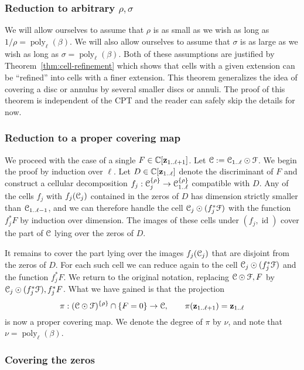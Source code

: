 \documentclass[reqno]{amsart}
\renewcommand\~[1]{\widetilde{#1}}
\def\poly{\operatorname{poly}} \def\J{\operatorname{J}}
\def\cF{{\mathcal F}} \def\cL{{\mathcal L}} \def\cR{{\mathcal R}}
\def\id{\operatorname{id}}
\def\vz{{\mathbf z}}
\def\he#1{{\{#1\}}}
\def\hrho{{\he\rho}}
\begin{document}
\subsubsection{Reduction to arbitrary $\rho,\sigma$}

We will allow ourselves to assume that $\rho$ is as small as we wish
as long as $1/\rho=\poly_\ell(\beta)$. We will also allow ourselves to
assume that $\sigma$ is as large as we wish as long as
$\sigma=\poly_\ell(\beta)$. Both of these assumptions are justified by
Theorem~\ref{thm:cell-refinement} which shows that cells with a given
extension can be ``refined'' into cells with a finer extension. This
theorem generalizes the idea of covering a disc or annulus by several
smaller discs or annuli. The proof of this theorem is independent of
the CPT and the reader can safely skip the details for now.


\subsubsection{Reduction to a proper covering map}
We proceed with the case of a single $F\in\C[\vz_{1..\ell+1}]$. Let
$\cC:=\cC_{1..\ell}\odot\cF$. We begin the proof by induction over
$\ell$. Let $D\in\C[\vz_{1..\ell}]$ denote the discriminant of $F$ and
construct a cellular decomposition
$f_j:\cC_j^\hrho\to\cC_{1..\ell}^\hrho$ compatible with $D$. Any of the cells $f_j$ with
$f_j({\mathcal C}_j)$ contained in the zeros of $D$ has dimension strictly
smaller than ${\mathcal C}_{1..\ell-1}$, and we can therefore handle the cell
$\cC_j\odot(f_j^*\cF)$ with the function $f_j^*F$ by induction over
dimension. The images of these cells under $(f_j,\id)$ cover the part
of ${\mathcal C}$ lying over the zeros of $D$.

It remains to cover the part lying over the images $f_j({\mathcal C}_j)$ that
are disjoint from the zeros of $D$. For each such cell we can reduce
again to the cell $\cC_j\odot(f_j^*\cF)$ and the function $f_j^*F$. We
return to the original notation, replacing $\cC\odot\cF,F$ by
$\cC_j\odot(f_j^*\cF),f_j^*F$. What we have gained is that the
projection
\begin{equation}
  \pi: (\cC\odot\cF)^{\hrho}\cap\{F=0\}\to\cC, \qquad \pi(\vz_{1..\ell+1})=\vz_{1..\ell}
\end{equation}
is now a proper covering map. We denote the degree of $\pi$ by $\nu$,
and note that $\nu=\poly_\ell(\beta)$.

\subsubsection{Covering the zeros}
\end{document}
